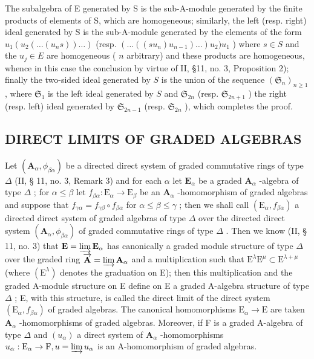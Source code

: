 The subalgebra of E generated by S is the sub-A-module generated by the finite products of elements of S, which are homogeneous; similarly, the left (resp. right) ideal generated by S is the sub-A-module generated by the elements of the form \(u_{1}(u_{2}(\ldots(u_{n}s))\ldots)\) (resp. \((\ldots((su_{n})u_{n-1})\ldots)u_{2})u_{1}\) ) where \(s \in S\) and the \(u_{j} \in E\) are homogeneous ( \(n\) arbitrary) and these products are homogeneous, whence in this case the conclusion by virtue of II, §11, no. 3, Proposition 2); finally the two-sided ideal generated by \(S\) is the union of the sequence \((\mathfrak{S}_{n})_{n \geqslant 1}\) , where \(\mathfrak{S}_{1}\) is the left ideal generated by \(S\) and \(\mathfrak{S}_{2n}\) (resp. \(\mathfrak{S}_{2n+1}\) ) the right (resp. left) ideal generated by \(\mathfrak{S}_{2n-1}\) (resp. \(\mathfrak{S}_{2n}\) ), which completes the proof.

\subsection{DIRECT LIMITS OF GRADED ALGEBRAS}

Let \((\mathbf{A}_{\alpha},\phi_{\beta \alpha})\) be a directed direct system of graded commutative rings of type \(\Delta\) (II, § 11, no. 3, Remark 3) and for each \(\alpha\) let \(\mathbf{E}_{\alpha}\) be a graded \(\mathbf{A}_{\alpha}\) -algebra of type \(\Delta\) ; for \(\alpha \leqslant \beta\) let \(f_{\beta \alpha}:\mathrm{E}_{\alpha}\to \mathrm{E}_{\beta}\) be an \(\mathbf{A}_{\alpha}\) -homomorphism of graded algebras and suppose that \(f_{\gamma \alpha} = f_{\gamma \beta}\circ f_{\beta \alpha}\) for \(\alpha \leqslant \beta \leqslant \gamma\) ; then we shall call \((\mathrm{E}_{\alpha},f_{\beta \alpha})\) a directed direct system of graded algebras of type \(\Delta\) over the directed direct system \((\mathbf{A}_{\alpha},\phi_{\beta \alpha})\) of graded commutative rings of type \(\Delta\) . Then we know (II, § 11, no. 3) that \(\mathbf{E} = \varinjlim \mathbf{E}_{\alpha}\) has canonically a graded module structure of type \(\Delta\) over the graded ring \(\overrightarrow{\mathbf{A}} = \varinjlim \mathbf{A}_{\alpha}\) and a multiplication such that \(\mathrm{E}^{\lambda}\mathrm{E}^{\mu}\subset \mathrm{E}^{\lambda +\mu}\) (where \((\mathrm{E}^{\lambda})\) denotes the graduation on E); then this multiplication and the graded A-module structure on E define on E a graded A-algebra structure of type \(\Delta\) ; E, with this structure, is called the direct limit of the direct system \((\mathrm{E}_{\alpha},f_{\beta \alpha})\) of graded algebras. The canonical homomorphisms \(\mathrm{E}_{\alpha}\rightarrow \mathrm{E}\) are taken \(\mathbf{A}_{\alpha}\) -homomorphisms of graded algebras. Moreover, if F is a graded A-algebra of type \(\Delta\) and \((u_{\alpha})\) a direct system of \(\mathbf{A}_{\alpha}\) -homomorphisms \(u_{\alpha}:\mathrm{E}_{\alpha}\rightarrow \mathrm{F}, u = \varinjlim u_{\alpha}\) is an A-homomorphism of graded algebras.

